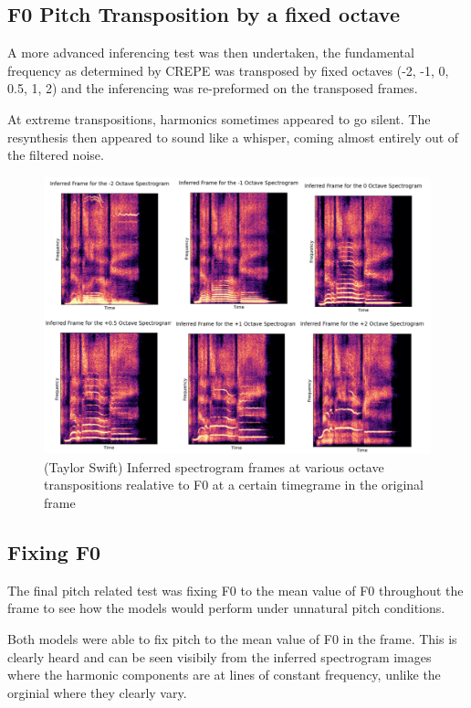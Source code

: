 \subsection{F0 Pitch Transposition by a fixed octave}

A more advanced inferencing test was then undertaken, the fundamental frequency as determined by CREPE was transposed by fixed octaves (-2, -1, 0, 0.5, 1, 2) and the inferencing was re-preformed on the transposed frames.

At extreme transpositions, harmonics sometimes appeared to go silent. The resynthesis then appeared to sound like a whisper, coming almost entirely out of the filtered noise.

\begin{figure}
    \centering
    \includegraphics[width=\textwidth]{research/results/TaylorSwift/InferredTranspositions.png}
    \caption{(Taylor Swift) Inferred spectrogram frames at various octave transpositions realative to F0 at a certain timegrame in the original frame}
\end{figure}

\subsection{Fixing F0}

The final pitch related test was fixing F0 to the mean value of F0 throughout the frame to see how the models would perform under unnatural pitch conditions.

Both models were able to fix pitch to the mean value of F0 in the frame. This is clearly heard and can be seen visibily from the inferred spectrogram images where the harmonic components are at lines of constant frequency, unlike the orginial where they clearly vary.


